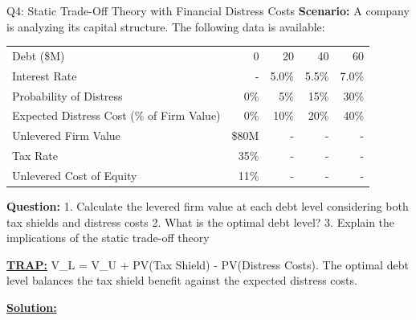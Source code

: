 \documentclass{beamer}
\renewcommand{\scriptsize}{\fontsize{6pt}{7pt}\selectfont}
\begin{document}
	\begin{frame}{Q4: Static Trade-Off Theory with Financial Distress Costs}
		\scriptsize
		\textbf{Scenario:} A company is analyzing its capital structure. The following data is available:
		
		\begin{tabular}{lrrrr}
			Debt (\$M) & 0 & 20 & 40 & 60 \\
			Interest Rate & - & 5.0\% & 5.5\% & 7.0\% \\
			Probability of Distress & 0\% & 5\% & 15\% & 30\% \\
			Expected Distress Cost (\% of Firm Value) & 0\% & 10\% & 20\% & 40\% \\
			Unlevered Firm Value & \$80M & - & - & - \\
			Tax Rate & 35\% & - & - & - \\
			Unlevered Cost of Equity & 11\% & - & - & - \\
		\end{tabular}
		
		\textbf{Question:}
		1. Calculate the levered firm value at each debt level considering both tax shields and distress costs
		2. What is the optimal debt level?
		3. Explain the implications of the static trade-off theory
		
		\vspace{2pt}
		\underline{\textbf{TRAP:}} V\_L = V\_U + PV(Tax Shield) - PV(Distress Costs). The optimal debt level balances the tax shield benefit against the expected distress costs.
		
		\vspace{4pt}
		\underline{\textbf{Solution:}}
	\end{frame}
	
\end{document}
